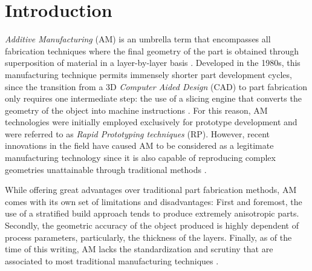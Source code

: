 \documentclass[main.tex]{subfiles}
\begin{document}
\chapter*{Introduction}
 
\emph{Additive Manufacturing} (AM) is an umbrella term that encompasses all fabrication techniques where the final geometry of the part is obtained through superposition of material in a layer-by-layer basis \cite{Gibson2015}. Developed in the 1980s, this manufacturing technique permits immensely shorter part development cycles, since the transition from a 3D \emph{Computer Aided Design} (CAD) to part fabrication only requires one intermediate step: the use of a slicing engine that converts the geometry of the object into machine instructions \cite{Gibson2015}. For this reason, AM technologies were initially employed exclusively for prototype development and were referred to as \emph{Rapid Prototyping techniques} (RP). However, recent innovations in the field have caused AM to be considered as a legitimate manufacturing technology since it is also capable of reproducing complex geometries unattainable through traditional methods \cite{Gibson2015}.

While offering great advantages over traditional part fabrication methods, AM comes with its own set of limitations and disadvantages: First and foremost, the use of a stratified build approach tends to produce extremely anisotropic parts. Secondly, the geometric accuracy of the object produced is highly dependent of process parameters, particularly, the thickness of the layers. Finally, as of the time of this writing, AM lacks the standardization and scrutiny that are associated to most traditional manufacturing techniques \cite{Gibson2015}.  
\end{document}
